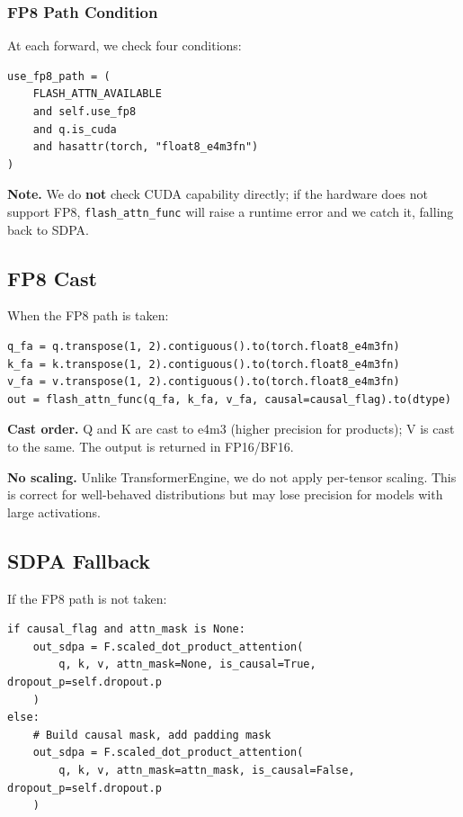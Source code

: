 \subsubsection{FP8 Path Condition}

At each forward, we check four conditions:

\begin{lstlisting}
use_fp8_path = (
    FLASH_ATTN_AVAILABLE
    and self.use_fp8
    and q.is_cuda
    and hasattr(torch, "float8_e4m3fn")
)
\end{lstlisting}

\textbf{Note.} We do \textbf{not} check CUDA capability directly; if the hardware 
does not support FP8, \texttt{flash\_attn\_func} will raise a runtime error and we 
catch it, falling back to SDPA.

\subsection{FP8 Cast}

When the FP8 path is taken:

\begin{lstlisting}
q_fa = q.transpose(1, 2).contiguous().to(torch.float8_e4m3fn)
k_fa = k.transpose(1, 2).contiguous().to(torch.float8_e4m3fn)
v_fa = v.transpose(1, 2).contiguous().to(torch.float8_e4m3fn)
out = flash_attn_func(q_fa, k_fa, v_fa, causal=causal_flag).to(dtype)
\end{lstlisting}

\textbf{Cast order.} Q and K are cast to e4m3 (higher precision for products); 
V is cast to the same. The output is returned in FP16/BF16.

\textbf{No scaling.} Unlike TransformerEngine, we do not apply per-tensor scaling. 
This is correct for well-behaved distributions but may lose precision for 
models with large activations.

\subsection{SDPA Fallback}

If the FP8 path is not taken:

\begin{lstlisting}
if causal_flag and attn_mask is None:
    out_sdpa = F.scaled_dot_product_attention(
        q, k, v, attn_mask=None, is_causal=True, dropout_p=self.dropout.p
    )
else:
    # Build causal mask, add padding mask
    out_sdpa = F.scaled_dot_product_attention(
        q, k, v, attn_mask=attn_mask, is_causal=False, dropout_p=self.dropout.p
    )
\end{lstlisting}

